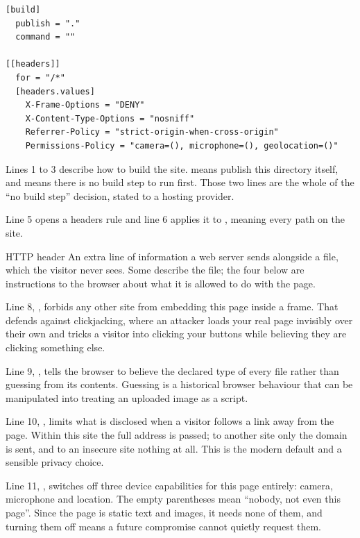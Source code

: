 \begin{lstlisting}[firstnumber=1,caption={\file{netlify.toml}, lines 1--11, the complete file}]
[build]
  publish = "."
  command = ""

[[headers]]
  for = "/*"
  [headers.values]
    X-Frame-Options = "DENY"
    X-Content-Type-Options = "nosniff"
    Referrer-Policy = "strict-origin-when-cross-origin"
    Permissions-Policy = "camera=(), microphone=(), geolocation=()"
\end{lstlisting}

Lines 1 to 3 describe how to build the site.  means publish
this directory itself, and  means there is no build step to run
first. Those two lines are the whole of the ``no build step'' decision, stated to
a hosting provider.

Line 5 opens a headers rule and line 6 applies it to \code{/*}, meaning every path
on the site.

\begin{jargon}{HTTP header}
An extra line of information a web server sends alongside a file, which the visitor
never sees. Some describe the file; the four below are instructions to the browser
about what it is allowed to do with the page.
\end{jargon}

Line 8, , forbids any other site from embedding this
page inside a frame. That defends against clickjacking, where an attacker loads your
real page invisibly over their own and tricks a visitor into clicking your buttons
while believing they are clicking something else.

Line 9, , tells the browser to believe the
declared type of every file rather than guessing from its contents. Guessing is a
historical browser behaviour that can be manipulated into treating an uploaded image
as a script.

Line 10, , limits what is
disclosed when a visitor follows a link away from the page. Within this site the full
address is passed; to another site only the domain is sent, and to an insecure site
nothing at all. This is the modern default and a sensible privacy choice.

Line 11, , switches off three device capabilities for this
page entirely: camera, microphone and location. The empty parentheses mean ``nobody,
not even this page''. Since the page is static text and images, it needs none of
them, and turning them off means a future compromise cannot quietly request them.

